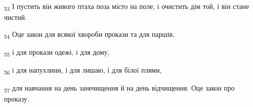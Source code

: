 \begin{tcolorbox}
\textsubscript{53} І пустить він живого птаха поза місто на поле, і очистить дім той, і він стане чистий.
\end{tcolorbox}
\begin{tcolorbox}
\textsubscript{54} Оце закон для всякої хвороби прокази та для паршів,
\end{tcolorbox}
\begin{tcolorbox}
\textsubscript{55} і для прокази одежі, і для дому,
\end{tcolorbox}
\begin{tcolorbox}
\textsubscript{56} і для напухлини, і для лишаю, і для білої плями,
\end{tcolorbox}
\begin{tcolorbox}
\textsubscript{57} для навчання на день занечищення й на день відчищення. Оце закон про проказу.
\end{tcolorbox}
